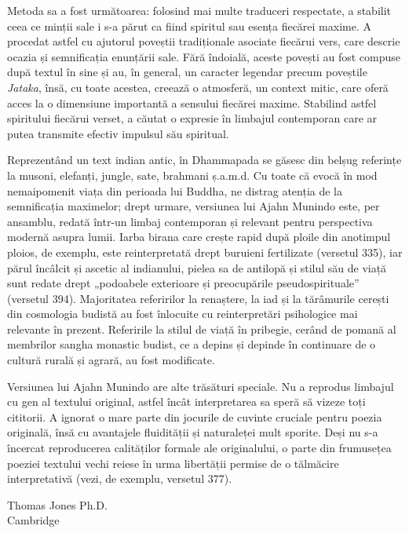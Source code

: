 Metoda sa a fost următoarea: folosind mai multe traduceri respectate, a stabilit ceea ce minții sale i s-a părut ca fiind spiritul sau esența fiecărei maxime. A procedat astfel cu ajutorul poveștii tradiționale asociate fiecărui vers, care descrie ocazia și semnificația enunțării sale. Fără îndoială, aceste povești au fost compuse după textul în sine și au, în general, un caracter legendar precum poveștile \emph{Jataka}, însă, cu toate acestea, creează o atmosferă, un context mitic, care oferă acces la o dimensiune importantă a sensului fiecărei maxime. Stabilind astfel spiritului fiecărui verset, a căutat o expresie în limbajul contemporan care ar putea transmite efectiv impulsul său spiritual.

Reprezentând un text indian antic, în Dhammapada se găsesc din belșug referințe la musoni, elefanți, jungle, sate, brahmani ș.a.m.d. Cu toate că evocă în mod nemaipomenit viața din perioada lui Buddha, ne distrag atenția de la semnificația maximelor; drept urmare, versiunea lui Ajahn Munindo este, per ansamblu, redată într-un limbaj contemporan și relevant pentru perspectiva modernă asupra lumii. Iarba birana care crește rapid după ploile din anotimpul ploios, de exemplu, este reinterpretată drept buruieni fertilizate (versetul 335), iar părul încâlcit și ascetic al indianului, pielea sa de antilopă și stilul său de viață sunt redate drept „podoabele exterioare și preocupările pseudospirituale” (versetul 394). Majoritatea referirilor la renaștere, la iad și la tărâmurile cerești din cosmologia budistă au fost înlocuite cu reinterpretări psihologice mai relevante în prezent. Referirile la stilul de viață în pribegie, cerând de pomană al membrilor sangha monastic budist, ce a depins și depinde în continuare de o cultură rurală și agrară, au fost modificate.

Versiunea lui Ajahn Munindo are alte trăsături speciale. Nu a reprodus limbajul cu gen al textului original, astfel încât interpretarea sa speră să vizeze toți cititorii. A ignorat o mare parte din jocurile de cuvinte cruciale pentru poezia originală, însă cu avantajele fluidității și naturaleței mult sporite. Deși nu s-a încercat reproducerea calităților formale ale originalului, o parte din frumusețea poeziei textului vechi reiese în urma libertății permise de o tălmăcire interpretativă (vezi, de exemplu, versetul 377).

\bigskip

{\raggedleft
Thomas Jones Ph.D.\\
Cambridge
\par}
